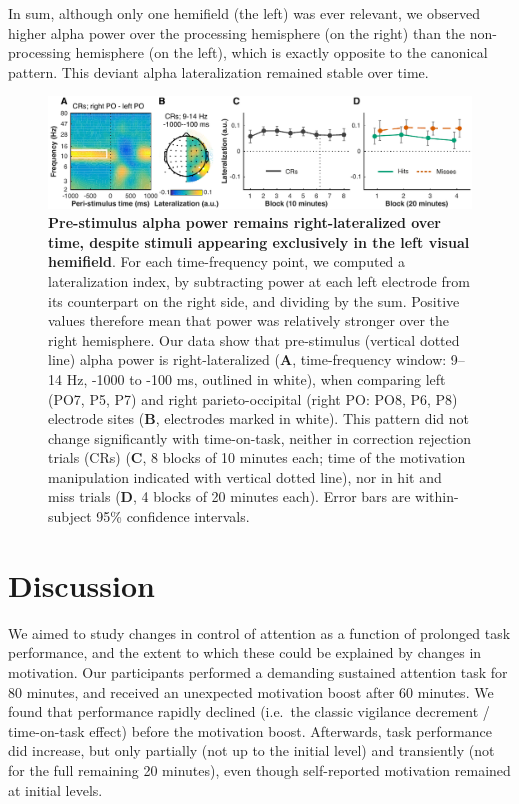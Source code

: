 \documentclass[11pt,]{memoir}
\begin{document}
In sum, although only one hemifield (the left) was ever relevant, we observed higher alpha power over the processing hemisphere (on the right) than the non-processing hemisphere (on the left), which is exactly opposite to the canonical pattern. This deviant alpha lateralization remained stable over time.



\begin{figure}
\centering
\includegraphics{MFBrain_files/figures/figure_5_latindex.pdf}
\caption{\label{fig:figure-5-latindex}\textbf{Pre-stimulus alpha power remains right-lateralized over time, despite stimuli appearing exclusively in the left visual hemifield}. For each time-frequency point, we computed a lateralization index, by subtracting power at each left electrode from its counterpart on the right side, and dividing by the sum. Positive values therefore mean that power was relatively stronger over the right hemisphere. Our data show that pre-stimulus (vertical dotted line) alpha power is right-lateralized (\textbf{A}, time-frequency window: 9--14 Hz, -1000 to -100 ms, outlined in white), when comparing left (PO7, P5, P7) and right parieto-occipital (right PO: PO8, P6, P8) electrode sites (\textbf{B}, electrodes marked in white). This pattern did not change significantly with time-on-task, neither in correction rejection trials (CRs) (\textbf{C}, 8 blocks of 10 minutes each; time of the motivation manipulation indicated with vertical dotted line), nor in hit and miss trials (\textbf{D}, 4 blocks of 20 minutes each). Error bars are within-subject \autocites{Cousineau2005}{Morey2008} 95\% confidence intervals.}
\end{figure}

\hypertarget{MFBrain-discussion}{%
\section{Discussion}\label{MFBrain-discussion}}

We aimed to study changes in control of attention as a function of prolonged task performance, and the extent to which these could be explained by changes in motivation. Our participants performed a demanding sustained attention task for 80 minutes, and received an unexpected motivation boost after 60 minutes. We found that performance rapidly declined (i.e.~the classic vigilance decrement / time-on-task effect) before the motivation boost. Afterwards, task performance did increase, but only partially (not up to the initial level) and transiently (not for the full remaining 20 minutes), even though self-reported motivation remained at initial levels.
\end{document}

